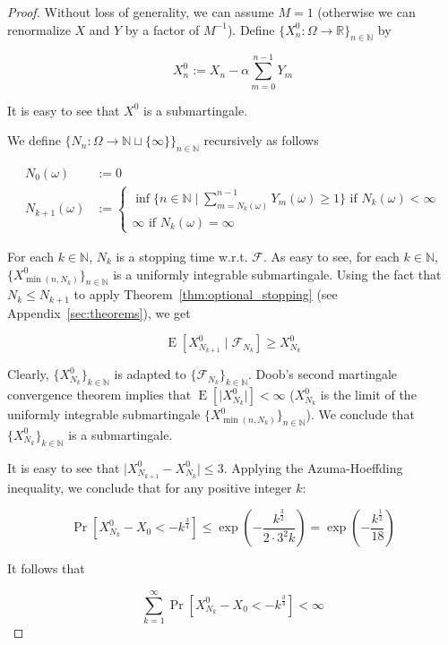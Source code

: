 \documentclass[11pt]{article}
\theoremstyle{definition}
\theoremstyle{plain}
\newcommand{\Nats}{\mathbb{N}}
\newcommand{\Reals}{\mathbb{R}}
\newcommand{\A}[1]{\lvert #1 \rvert}
\newcommand{\Sq}[2]{\{#1\}_{#2 \in \Nats}}
\newcommand{\Sqn}[1]{\Sq{#1}{n}}
\DeclareMathOperator{\E}{E}
\newcommand{\F}{\mathcal{F}}
\begin{document}
\begin{proof}

Without loss of generality, we can assume ${M = 1}$ (otherwise we can renormalize ${X}$ and ${Y}$ by a factor of ${M^{-1}}$). Define ${\Sqn{X^0_n: \Omega \rightarrow \Reals}}$ by

$$X^0_n := X_n - \alpha \sum_{m=0}^{n-1} Y_m$$

It is easy to see that ${X^0}$ is a submartingale.

We define ${\Sqn{N_n:\Omega \rightarrow \Nats \sqcup \{\infty\}}}$ recursively as follows

\begin{align*}
N_0\left(\omega\right) &:= 0 \\ 
N_{k+1}\left(\omega\right) &:= \begin{cases}\inf \{n \in \Nats \mid \sum_{m=N_k\left(\omega\right)}^{n-1} Y_m\left(\omega\right) \geq 1\} \text{ if } N_k\left(\omega\right) < \infty\\\infty \text{ if } N_k\left(\omega\right) = \infty\end{cases}
\end{align*}

For each $k \in \Nats$, $N_k$ is a stopping time w.r.t. ${\F}$. As easy to see, for each $k \in \Nats$, ${\Sqn{X^0_{\min\left(n,N_k\right)}}}$ is a uniformly integrable submartingale. Using the fact that ${N_{k} \leq N_{k+1}}$ to apply Theorem~\ref{thm:optional_stopping} (see Appendix~\ref{sec:theorems}), we get

$$\E\left[X^0_{N_{k+1}} \mid \F_{N_k}\right] \geq X^0_{N_{k}}$$

Clearly, ${\Sq{X^0_{N_k}}{k}}$ is adapted to ${\Sq{\F_{N_k}}{k}}$. Doob's second martingale convergence theorem implies that ${\E\left[\A{X^0_{N_k}}\right] < \infty}$ (${X^0_{N_k}}$ is the limit of the uniformly integrable submartingale ${\Sqn{X^0_{\min\left(n,N_k\right)}}}$). We conclude that ${\Sq{X^0_{N_k}}{k}}$ is a submartingale.

It is easy to see that ${\A{X^0_{N_{k+1}}-X^0_{N_k}}} \leq 3$. Applying the Azuma-Hoeffding inequality, we conclude that for any positive integer ${k}$:

$$\Pr\left[X^0_{N_k} - X_0 < -k^{\frac{3}{4}}\right] \leq \exp\left(-\frac{k^{\frac{3}{2}}}{2 \cdot 3^2k}\right)=\exp\left(-\frac{k^{\frac{1}{2}}}{18}\right)$$

It follows that

$$\sum_{k=1}^\infty \Pr\left[X^0_{N_k} - X_0 < -k^{\frac{3}{4}}\right] < \infty$$


\end{proof}
\end{document}
